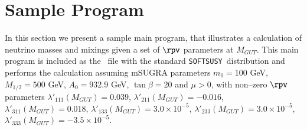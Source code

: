 \documentclass[pdflatex,final,3p,times]{elsarticle}
\def\SOFTSUSY{{\tt SOFTSUSY}}
\begin{document}
\section{Sample Program \label{sec:prog}}

In this section we present a sample main program, that illustrates a
calculation of neutrino masses and mixings given a set of $\rpv$
parameters at $M_{GUT}$.  This main program is included as the
~file with the standard \SOFTSUSY~distribution
and performs the calculation assuming mSUGRA parameters $m_0=100$ GeV,
$M_{1/2}=500$ GeV, $A_0=932.9$ GeV, $\tan \beta=20$ and $\mu>0$, with
non--zero $\rpv$ parameters $\lambda'_{111}(M_{GUT})=0.039$,
$\lambda'_{211}(M_{GUT})=-0.016$, $\lambda'_{311}(M_{GUT})=0.018$,
$\lambda'_{133}(M_{GUT})=3.0\times10^{-5}$,
$\lambda'_{233}(M_{GUT})=3.0\times 10^{-5}$,
$\lambda'_{333}(M_{GUT})=-3.5\times10^{-5}$.  
\end{document}

